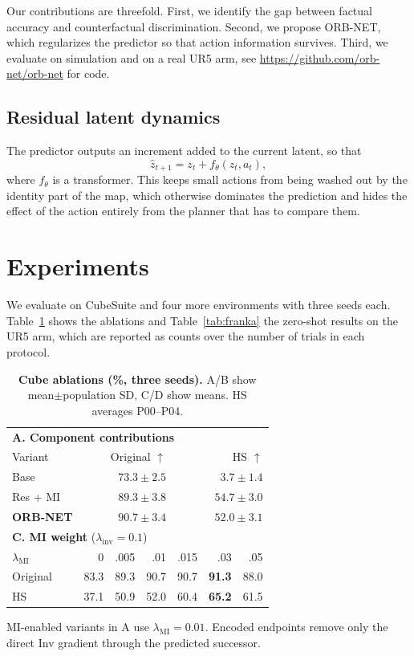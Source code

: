 \documentclass[conference]{IEEEtran}
\begin{document}
Our contributions are threefold. First, we identify the gap between factual accuracy and counterfactual discrimination. Second, we propose ORB-NET, which regularizes the predictor so that action information survives. Third, we evaluate on simulation and on a real UR5 arm, see \url{https://github.com/orb-net/orb-net} for code.
\subsection{Residual latent dynamics}
The predictor outputs an increment added to the current latent, so that
\begin{equation}
\hat z_{t+1} = z_t + f_\theta(z_t, a_t),
\end{equation}
where $f_\theta$ is a transformer. This keeps small actions from being washed out by the identity part of the map, which otherwise dominates the prediction and hides the effect of the action entirely from the planner that has to compare them.
\section{Experiments}
We evaluate on CubeSuite and four more environments with three seeds each. Table~\ref{tab:abl} shows the ablations and Table~\ref{tab:franka} the zero-shot results on the UR5 arm, which are reported as counts over the number of trials in each protocol.
\begin{table}[t]
\caption{\textbf{Cube ablations (\%, three seeds).} A/B show mean$\pm$population SD, C/D show means. HS averages P00--P04.}
\label{tab:abl}
\centering\footnotesize
\begin{tabular}{lrrrrrr}
\toprule
\multicolumn{7}{l}{\textbf{A. Component contributions}}\\
Variant & \multicolumn{3}{r}{Original $\uparrow$} & \multicolumn{3}{r}{HS $\uparrow$}\\
\midrule
Base & \multicolumn{3}{r}{$73.3\pm2.5$} & \multicolumn{3}{r}{$3.7\pm1.4$}\\
Res + MI & \multicolumn{3}{r}{$89.3\pm3.8$} & \multicolumn{3}{r}{$\mathbf{54.7\pm3.0}$}\\
\rowcolor{blue!10}\textbf{ORB-NET} & \multicolumn{3}{r}{$\mathbf{90.7\pm3.4}$} & \multicolumn{3}{r}{$52.0\pm3.1$}\\
\midrule
\multicolumn{7}{l}{\textbf{C. MI weight} ($\lambda_{\mathrm{inv}}=0.1$)}\\
$\lambda_{\mathrm{MI}}$ & 0 & .005 & .01 & .015 & .03 & .05\\
\midrule
Original & 83.3 & 89.3 & 90.7 & 90.7 & \textbf{91.3} & 88.0\\
HS & 37.1 & 50.9 & 52.0 & 60.4 & \textbf{65.2} & 61.5\\
\bottomrule
\end{tabular}

\vspace{2pt}
\parbox{\linewidth}{\scriptsize MI-enabled variants in A use $\lambda_{\mathrm{MI}}=0.01$. Encoded endpoints remove only the direct Inv gradient through the predicted successor.}
\end{table}
\end{document}
